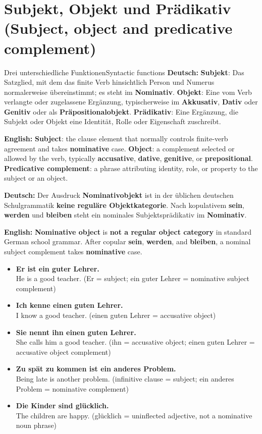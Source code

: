 \documentclass[a4paper,11pt]{article}
\newcommand{\GermanText}[1]{\textbf{Deutsch: }#1\par}
\newcommand{\EnglishText}[1]{{\small\color{SoftGray}\textbf{English: }#1\par}}
\newcommand{\ExampleItem}[2]{\item \textbf{#1}\\{\small\color{SoftGray}#2}}
\begin{document}
    \section{Subjekt, Objekt und Prädikativ \textnormal{(Subject, object and predicative complement)}}
        \begin{grammarentry}{Drei unterschiedliche Funktionen}{Syntactic functions}
            \GermanText{\textbf{Subjekt}: Das Satzglied, mit dem das finite Verb hinsichtlich Person und Numerus normalerweise übereinstimmt; es steht im \textbf{Nominativ}. \textbf{Objekt}: Eine vom Verb verlangte oder zugelassene Ergänzung, typischerweise im \textbf{Akkusativ}, \textbf{Dativ} oder \textbf{Genitiv} oder als \textbf{Präpositionalobjekt}. \textbf{Prädikativ}: Eine Ergänzung, die Subjekt oder Objekt eine Identität, Rolle oder Eigenschaft zuschreibt.}
            \EnglishText{\textbf{Subject}: the clause element that normally controls finite-verb agreement and takes \textbf{nominative} case. \textbf{Object}: a complement selected or allowed by the verb, typically \textbf{accusative}, \textbf{dative}, \textbf{genitive}, or \textbf{prepositional}. \textbf{Predicative complement}: a phrase attributing identity, role, or property to the subject or an object.}
            \GermanText{Der Ausdruck \textbf{Nominativobjekt} ist in der üblichen deutschen Schulgrammatik \textbf{keine reguläre Objektkategorie}. Nach kopulativem \textbf{sein}, \textbf{werden} und \textbf{bleiben} steht ein nominales Subjektsprädikativ im \textbf{Nominativ}.}
            \EnglishText{\textbf{Nominative object} is \textbf{not a regular object category} in standard German school grammar. After copular \textbf{sein}, \textbf{werden}, and \textbf{bleiben}, a nominal subject complement takes \textbf{nominative} case.}
        \end{grammarentry}

        \begin{exbox}\begin{itemize}
            \ExampleItem{Er ist ein guter Lehrer.}{He is a good teacher. (Er = subject; ein guter Lehrer = nominative subject complement)}
            \ExampleItem{Ich kenne einen guten Lehrer.}{I know a good teacher. (einen guten Lehrer = accusative object)}
            \ExampleItem{Sie nennt ihn einen guten Lehrer.}{She calls him a good teacher. (ihn = accusative object; einen guten Lehrer = accusative object complement)}
            \ExampleItem{Zu spät zu kommen ist ein anderes Problem.}{Being late is another problem. (infinitive clause = subject; ein anderes Problem = nominative complement)}
            \ExampleItem{Die Kinder sind glücklich.}{The children are happy. (glücklich = uninflected adjective, not a nominative noun phrase)}
        \end{itemize}\end{exbox}
\end{document}

